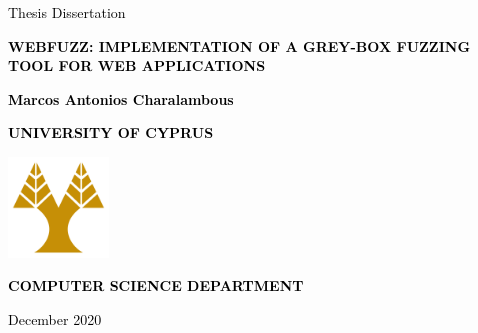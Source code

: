 \documentclass[12pt]{report}
\def\pname{webFuzz\xspace}
\def\ptitle{\pname: Implementation of a Grey-box Fuzzing Tool for Web Applications}
\begin{document}
\begin{titlepage}
\begin{center}
\vspace*{1cm}

\textcolor{black}{Thesis Dissertation}

\vspace*{2cm}

\textcolor{black}{\Large{\textbf{\MakeUppercase{\ptitle{}}}}}

\vspace*{2cm}

\textcolor{black}{\large{\textbf{Marcos Antonios Charalambous}}}

\vspace*{2cm}
\textcolor{black}{\Large{\textbf{\MakeUppercase{University of Cyprus}}}}

\vspace*{2cm}

\includegraphics[width=0.2\textwidth]{ucy-logo.png}

\vspace*{2cm}

\textcolor{black}{\Large{\textbf{\MakeUppercase{Computer Science Department}}}}

\vspace*{4cm}

\textcolor{black}{\normalsize{December 2020}}
\end{center}
\end{titlepage}
\end{document}
